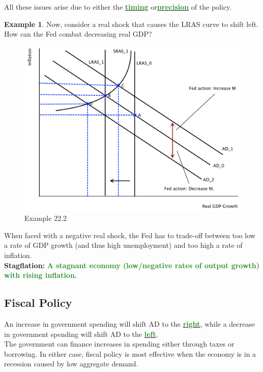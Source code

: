 \documentclass[11pt]{article}\usepackage[]{graphicx}\usepackage[]{color}
\theoremstyle{definition}
\newtheorem{exmp}{Example}[section]
\newcommand{\ddp}[1]{{\textbf{\textcolor{ForestGreen}{#1}}}}
\newcommand{\dd}[1]{{\underline{\textbf{\textcolor{ForestGreen}{#1}}}}}
\newcommand{\defn}[1]{\textbf{#1}}
\begin{document}
All these issues arise due to either the \dd{timing} or\dd{precision} of the policy.
\\

\begin{exmp}
Now, consider a real shock that causes the LRAS curve to shift left. How can the Fed combat decreasing real GDP?
\end{exmp}

\begin{figure}[H]
	\centering
	\includegraphics[scale=.40]{plot103.pdf}
	\caption{Example 22.2}
\end{figure}

When faced with a negative real shock, the Fed has to trade-off between too low a rate of GDP growth (and thus high unemployment) and too high a rate of inflation.
\\

\defn{Stagflation:} \ddp{A stagnant economy (low/negative rates of output growth) with rising inflation.}

\subsection{Fiscal Policy}

An increase in government spending will shift AD to the \dd{right}, while a decrease in government spending will shift AD to the \dd{left}. 
\\

The government can finance increases in spending either through taxes or borrowing. In either case, fiscal policy is most effective when the economy is in a recession caused by low aggregate demand. 
\end{document}

